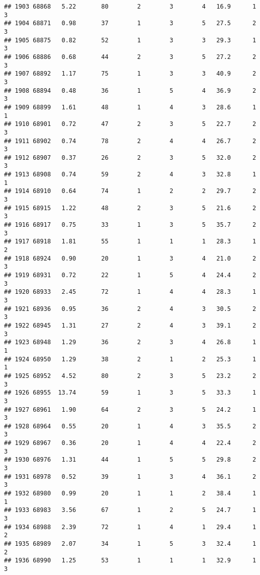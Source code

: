 \documentclass[
]{article}
\begin{document}
\begin{verbatim}
## 1903 68868   5.22       80        2        3        4   16.9      1      3
## 1904 68871   0.98       37        1        3        5   27.5      2      3
## 1905 68875   0.82       52        1        3        3   29.3      1      3
## 1906 68886   0.68       44        2        3        5   27.2      2      3
## 1907 68892   1.17       75        1        3        3   40.9      2      3
## 1908 68894   0.48       36        1        5        4   36.9      2      3
## 1909 68899   1.61       48        1        4        3   28.6      1      1
## 1910 68901   0.72       47        2        3        5   22.7      2      3
## 1911 68902   0.74       78        2        4        4   26.7      2      3
## 1912 68907   0.37       26        2        3        5   32.0      2      3
## 1913 68908   0.74       59        2        4        3   32.8      1      1
## 1914 68910   0.64       74        1        2        2   29.7      2      3
## 1915 68915   1.22       48        2        3        5   21.6      2      3
## 1916 68917   0.75       33        1        3        5   35.7      2      3
## 1917 68918   1.81       55        1        1        1   28.3      1      2
## 1918 68924   0.90       20        1        3        4   21.0      2      3
## 1919 68931   0.72       22        1        5        4   24.4      2      3
## 1920 68933   2.45       72        1        4        4   28.3      1      3
## 1921 68936   0.95       36        2        4        3   30.5      2      3
## 1922 68945   1.31       27        2        4        3   39.1      2      3
## 1923 68948   1.29       36        2        3        4   26.8      1      1
## 1924 68950   1.29       38        2        1        2   25.3      1      1
## 1925 68952   4.52       80        2        3        5   23.2      2      3
## 1926 68955  13.74       59        1        3        5   33.3      1      3
## 1927 68961   1.90       64        2        3        5   24.2      1      3
## 1928 68964   0.55       20        1        4        3   35.5      2      3
## 1929 68967   0.36       20        1        4        4   22.4      2      3
## 1930 68976   1.31       44        1        5        5   29.8      2      3
## 1931 68978   0.52       39        1        3        4   36.1      2      3
## 1932 68980   0.99       20        1        1        2   38.4      1      1
## 1933 68983   3.56       67        1        2        5   24.7      1      3
## 1934 68988   2.39       72        1        4        1   29.4      1      2
## 1935 68989   2.07       34        1        5        3   32.4      1      2
## 1936 68990   1.25       53        1        1        1   32.9      1      3

\end{verbatim}
\end{document}
